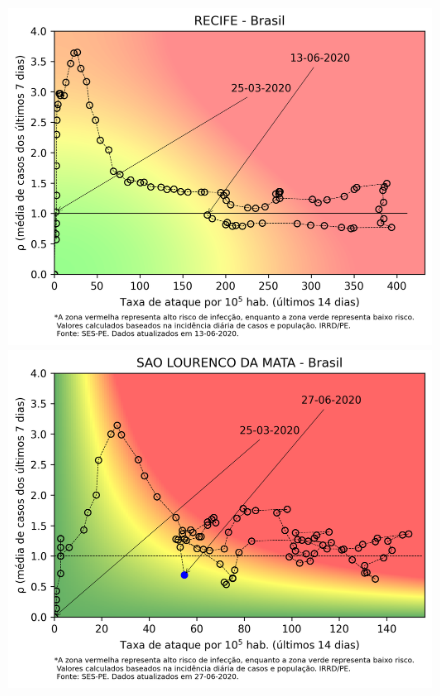 \documentclass[]{article}
\begin{document}

\begin{figure}[!h]
	\centering
	\begin{minipage}[t]{4cm}
		\centering
		\includegraphics[scale=0.5]{../RECIFE.png}
	\end{minipage}
	\hspace{5cm}
	\begin{minipage}[t]{4cm}
		\centering
		\includegraphics[scale=0.5]{../SAOLOURENCODAMATA.png}
			\vspace{0.2cm}
	\end{minipage}


\end{figure}
\end{document}
